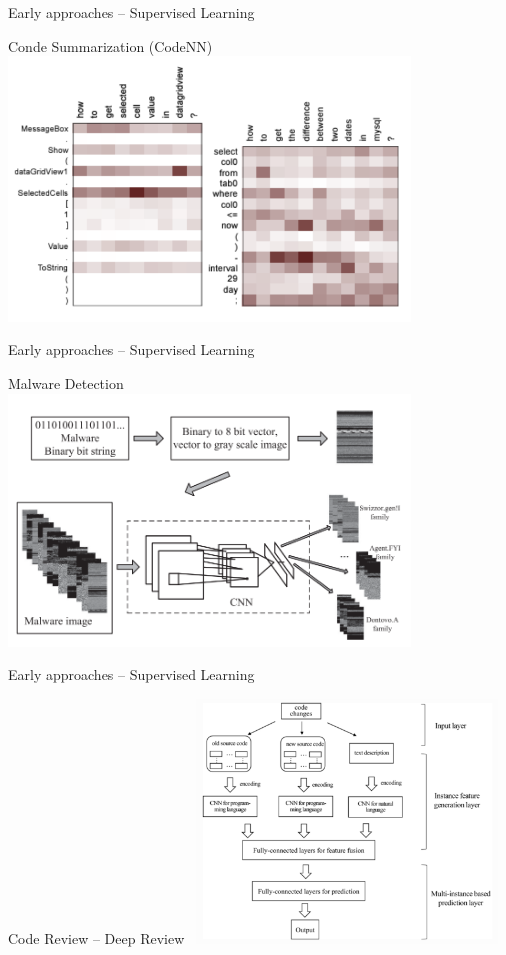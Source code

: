 \documentclass[presentation, 10pt]{beamer}\mode<presentation>{\usetheme{AMSBolognaFC}}
\begin{document}
\begin{frame}{Early approaches -- Supervised Learning}
\begin{exampleblock}{Conde Summarization (CodeNN)~\cite{DBLP:conf/acl/IyerKCZ16}}
\centering
\includegraphics[width=0.8\textwidth]{img/codenn.png}
\end{exampleblock}
\end{frame}
\begin{frame}{Early approaches -- Supervised Learning}
\begin{exampleblock}{Malware Detection~\cite{DBLP:journals/tii/CuiXCCWC18}}
\centering
\includegraphics[width=0.8\textwidth]{img/malware-detection.png}
\end{exampleblock}
\end{frame}
\begin{frame}{Early approaches -- Supervised Learning}
\begin{exampleblock}{Code Review -- Deep Review~\cite{DBLP:conf/pakdd/LiSTHXLL19}}
\centering
\includegraphics[width=0.6\textwidth]{img/deep-review.png}
\end{exampleblock}
\end{frame}
\end{document}
